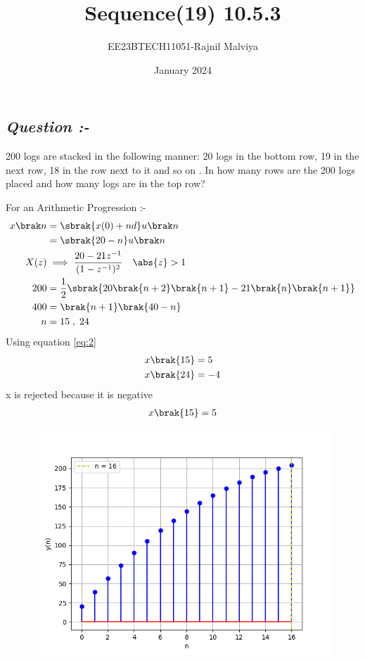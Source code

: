\documentclass[journal,12pt,twocolumn]{IEEEtran}
\theoremstyle{remark}
\begin{document}
\title{Sequence(19) 10.5.3}
\author{EE23BTECH11051-Rajnil Malviya}
\date{January 2024}
\maketitle
\subsection*{\textit{Question :-}}
200 logs are stacked in the following manner: 20 logs in the bottom row, 19 in the next row,
18 in the row next to it and so on . In how many rows are the 200 logs placed
and how many logs are in the top row?

\begin{table}[h!]
            
    \end{table}
For an Arithmetic Progression :-
\begin{align}x\brak n&=\sbrak {x(0)+n d} u \brak n \label{eq:1}\\
&=\sbrak{20-n} u \brak n \label{eq:2}\\
 X(z)&\implies\frac{20-21z^{-1}}{(1 - z^{-1})^2}  \quad \abs{ z} > 1 \label{eq:3}\\
  200 &=\frac{1}{2}\sbrak{20\brak{n+2}\brak{n+1}-21\brak{n}\brak{n+1}} \label{eq:4}\\
  400&=\brak{n+1} \brak{40-n} \label{eq:5}\\
   n & =15\; ,\;24 \label{eq:6}
 \end{align}
Using equation \eqref{eq:2}
\begin{align} &x\brak{15}=5 \label{eq:7}\\
 &x\brak{24}=-4 \label{eq:8} \end{align}
x is rejected because it is negative
\begin{align}x\brak{15}=5\end{align}
\begin{figure}
   \includegraphics[width=1\linewidth]{figs/f2.png}
\end{figure}
\end{document}

